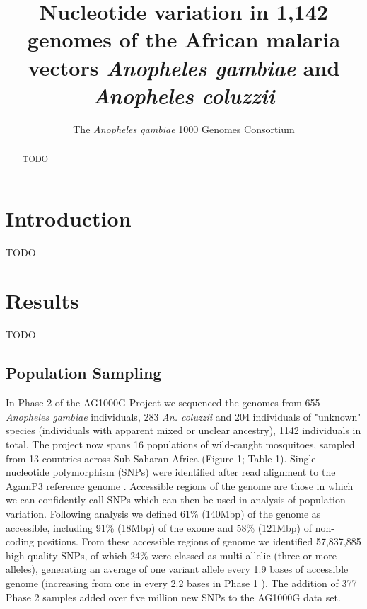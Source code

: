 \documentclass[a4paper,11pt,abstracton,hidelinks]{scrartcl}
\title{
Nucleotide variation in 1,142 genomes of the African malaria vectors \emph{Anopheles gambiae} and \emph{Anopheles coluzzii}
}
\author[1]{\small The \emph{Anopheles gambiae} 1000 Genomes Consortium}
\affil[1]{\footnotesize A list of consortium members appears at the end of the paper}
\begin{document}
\maketitle


\begin{abstract}

TODO

\end{abstract}


\section*{Introduction}

TODO


\section*{Results}

TODO

\subsection*{Population Sampling}


%
In Phase 2 of the AG1000G Project we sequenced the genomes from 655 \textit{Anopheles gambiae} individuals, 283 \textit{An. coluzzii} and 204 individuals of "unknown" species (individuals with apparent mixed or unclear ancestry), 1142 individuals in total.
%
The project now spans 16 populations of wild-caught mosquitoes, sampled from 13 countries across Sub-Saharan Africa (Figure 1; Table 1). 
%
Single nucleotide polymorphism (SNPs) were identified after read alignment to the AgamP3 reference genome \cite{Holt2002}.
%
Accessible regions of the genome are those in which we can confidently call SNPs which can then be used in analysis of population variation.
%
Following analysis we defined 61\% (140Mbp) of the genome as accessible, including 91\% (18Mbp) of the exome and 58\% (121Mbp) of non-coding positions.
%
From these accessible regions of genome we identified 57,837,885 high-quality SNPs, of which 24\% were classed as multi-allelic (three or more alleles), generating an average of one variant allele every 1.9 bases of accessible genome (increasing from one in every 2.2 bases in Phase 1 \cite{Ag1000gConsortium2017}). 
%
The addition of 377 Phase 2 samples added over five million new SNPs to the AG1000G data set.
\end{document}
